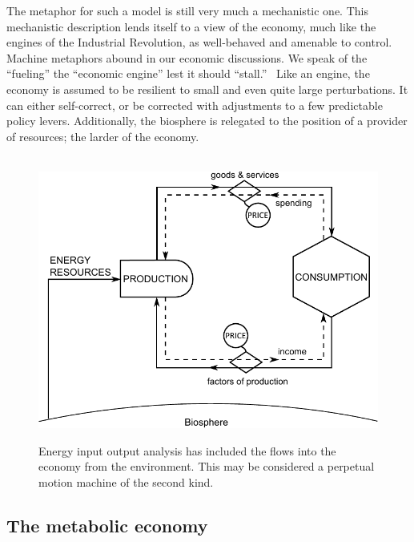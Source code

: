 The metaphor for such a model is still very much
a mechanistic one.
This mechanistic description lends itself to a view of
the economy,
much like the engines of the Industrial Revolution,
as well-behaved and amenable to control.
Machine metaphors abound in our economic discussions.
We speak of the ``fueling'' the ``economic engine'' 
lest it should ``stall.''~\cite{Liu2012}
Like an engine, the economy is  assumed 
to be resilient to small and even quite large perturbations.  
It can either self-correct, 
or be corrected with adjustments to
a few predictable policy levers. 
Additionally, the biosphere is relegated to the position
of a provider of resources;
the larder of the economy.\cite{Norgaard2010}

\begin{figure}[!ht]
\centering\
\includegraphics[width=\linewidth]{Part_0/Chapter_Introduction/images/Perpetual_motion_2.pdf}
\caption[The traditional model supplemented with energy inputs]{Energy input output 
analysis has included the flows into the economy from the environment.
This may be considered a perpetual motion machine 
of the second kind.
}
\label{fig:perp_motion_2}
\end{figure}

\subsection{The metabolic economy}
\label{sec:metabolic}

